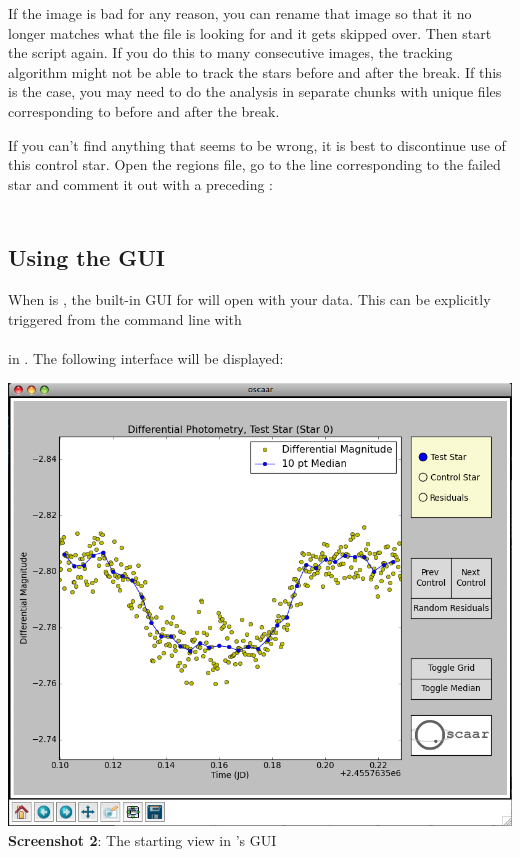 \documentclass{article}
\begin{document}
If the image is bad for any reason, you can rename that image so that it no longer matches what the  file is looking for and it gets skipped over. Then start the script again. If you do this to many consecutive images, the tracking algorithm might not be able to track the stars before and after the break. If this is the case, you may need to do the \oscaar  analysis in separate chunks with unique  files corresponding to before and after the break. 

If you can't find anything that seems to be wrong, it is best to discontinue use of this control star. Open the regions file, go to the  line corresponding to the failed star and comment it out with a preceding \code{\#}: \\

\indent {}\\

\subsection{Using the \oscaar  GUI} 
\label{sec:gui}

When  is , the built-in GUI for \oscaar  will open with your data. This can be explicitly triggered from the command line with \\

\indent {}\\

\noindent in . The following interface will be displayed:\\

\begin{center}
\includegraphics[scale=0.4]{imgs/gui1.png}
{\small \textbf{Screenshot 2}: The starting view in \oscaar 's GUI}
\end{center}
\bigskip
\end{document}

